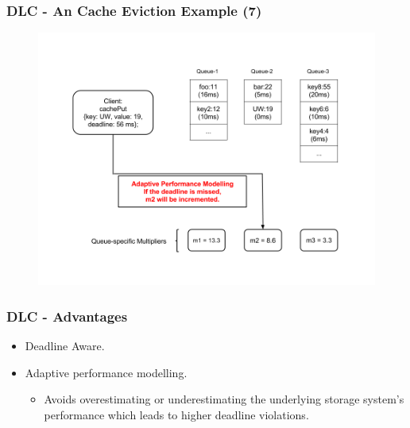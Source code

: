\documentclass{beamer}
\newcommand{\myv}{\vspace{3 mm}}
\begin{document}
\begin{frame}
  \frametitle{DLC - An Cache Eviction Example (7)}
  \begin{figure}
    \begin{center}
      \centerline{\includegraphics[scale=0.33]{img/DLC_NEW_7.png}}
    \end{center}
  \end{figure}
\end{frame}

\begin{frame}
  \frametitle{DLC - Advantages}
  \vspace{-15 mm}
  \begin{itemize}
  \item Deadline Aware.
    \myv
  \item Adaptive performance modelling.
    \begin{itemize}
      \myv
    \item Avoids overestimating or underestimating the underlying storage
      system's performance which leads to higher deadline violations.
      \myv
    \end{itemize}

  \end{itemize}
\end{frame}
\end{document}
